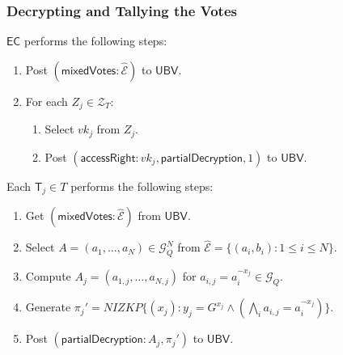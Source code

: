 \documentclass[bibtotoc,halfparskip,oneside]{scrreprt}
\newcommand{\vk}[1]{\mathit{vk}_{#1}\xspace}
\newcommand{\EC}{\ensuremath{\mathsf{EC}}\xspace}
\newcommand{\UBV}{\ensuremath{\mathsf{UBV}}\xspace}
\newcommand{\Tallier}[1]{\ensuremath{\mathsf{T}_{#1}}\xspace}
\begin{document}
\subsubsection{Decrypting and Tallying the Votes}

\EC performs the following steps:
\begin{enumerate}	
	\item Post $(\mathsf{mixedVotes}:\hat{\mathcal{E}})$ to \UBV.
	\item For each $Z_{j}\in \mathcal{Z}_{T}$:
	\begin{enumerate}
		\item Select $\vk{j}$ from $Z_{j}$.
		\item Post $(\mathsf{accessRight}:\vk{j},\mathsf{partialDecryption},1)$ to \UBV.
	\end{enumerate}
\end{enumerate}

Each $\Tallier{j}\in T$ performs the following steps:
\begin{enumerate}
	\item Get $(\mathsf{mixedVotes}:\hat{\mathcal{E}})$ from \UBV.
	\item Select $A=(a_1,\ldots,a_N)\in\mathcal{G}_Q^N$ from $\hat{\mathcal{E}}=\{(a_i,b_i):1\leq i\leq N\}$. 

	\item Compute $A_j = (a_{1,j},\ldots,a_{N,j})$ for $a_{i,j} = a_i^{-x_j}\in\mathcal{G}_Q$.
	\item Generate $\pi_{j}'=\mathit{NIZKP}\{(x_j):y_j=G^{x_j} \wedge \left(\bigwedge_i a_{i,j} = a_i^{-x_j}\right)\}$.
	\item Post $(\mathsf{partialDecryption}:A_j,\pi_{j}')$ to \UBV.
\end{enumerate}
\end{document}
